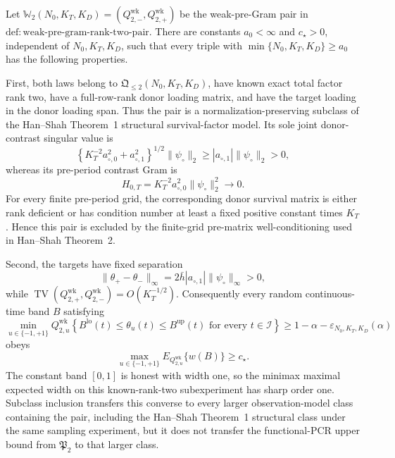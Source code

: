 Let \(\mathbb W_2(N_0,K_T,K_D)=(Q_{2,-}^{\mathrm{wk}},Q_{2,+}^{\mathrm{wk}})\) be the weak-pre-Gram pair in \(\mathrm{def:weak\mbox{-}pre\mbox{-}gram\mbox{-}rank\mbox{-}two\mbox{-}pair}\).  There are constants \(a_0<\infty\) and \(c_\star>0\), independent of \(N_0,K_T,K_D\), such that every triple with \(\min\{N_0,K_T,K_D\}\ge a_0\) has the following properties.

First, both laws belong to \(\mathfrak Q_{\leq2}(N_0,K_T,K_D)\), have known exact total factor rank two, have a full-row-rank donor loading matrix, and have the target loading in the donor loading span.  Thus the pair is a normalization-preserving subclass of the Han--Shah Theorem~1 structural survival-factor model.  Its sole joint donor-contrast singular value is
\[
 \left\{K_T^{-2}a_{\circ,0}^2+a_{\circ,1}^2\right\}^{1/2}
 \|\psi_\circ\|_2
 \ge |a_{\circ,1}|\|\psi_\circ\|_2>0,
\]
whereas its pre-period contrast Gram is
\[
 H_{0,T}=K_T^{-2}a_{\circ,0}^2\|\psi_\circ\|_2^2\longrightarrow0.
\]
For every finite pre-period grid, the corresponding donor survival matrix is either rank deficient or has condition number at least a fixed positive constant times \(K_T\).  Hence this pair is excluded by the finite-grid pre-matrix well-conditioning used in Han--Shah Theorem~2.

Second, the targets have fixed separation
\[
 \|\theta_+-\theta_-\|_\infty
 =2\bar h|a_{\circ,1}|\|\psi_\circ\|_\infty>0,
\]
while \(\operatorname{TV}(Q_{2,+}^{\mathrm{wk}},Q_{2,-}^{\mathrm{wk}})=O(K_T^{-1/2})\).  Consequently every random continuous-time band \(B\) satisfying
\[
 \min_{u\in\{-1,+1\}}Q_{2,u}^{\mathrm{wk}}
 \left\{B^{\mathrm{lo}}(t)\le\theta_u(t)\le B^{\mathrm{up}}(t)
 \text{ for every }t\in\mathcal I\right\}
 \ge1-\alpha-\varepsilon_{N_0,K_T,K_D}(\alpha)
\]
obeys
\[
 \max_{u\in\{-1,+1\}}E_{Q_{2,u}^{\mathrm{wk}}}\{w(B)\}\ge c_\star.
\]
The constant band \([0,1]\) is honest with width one, so the minimax maximal expected width on this known-rank-two subexperiment has sharp order one.  Subclass inclusion transfers this converse to every larger observation-model class containing the pair, including the Han--Shah Theorem~1 structural class under the same sampling experiment, but it does not transfer the functional-PCR upper bound from \(\mathfrak P_2\) to that larger class.